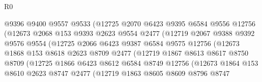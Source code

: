 \begin{lexlean}{R0}
\begin{coremodule}
                          @9396
                          @9400
                          @9557
                          @9533
                          (@12725
                            @2070
                            @6423
                            @9395
                            @6584
                            @9556
                            @12756
                            (@12673
                              @2068
                              @153
                              @9393
                              @2623
                              @9554
                              @2477
                              (@12719
                                @2067
                                @9388
                                @9392
                                @9576
                                @9554
                                (@12725
                                  @2066
                                  @6423
                                  @9387
                                  @6584
                                  @9575
                                  @12756
                                  (@12673
                                    @1868
                                    @153
                                    @8618
                                    @2623
                                    @8709
                                    @2477
                                    (@12719
                                      @1867
                                      @8613
                                      @8617
                                      @8750
                                      @8709
                                      (@12725
                                        @1866
                                        @6423
                                        @8612
                                        @6584
                                        @8749
                                        @12756
                                        (@12673
                                          @1864
                                          @153
                                          @8610
                                          @2623
                                          @8747
                                          @2477
                                          (@12719
                                            @1863
                                            @8605
                                            @8609
                                            @8796
                                            @8747

\end{coremodule}
\end{lexlean}
